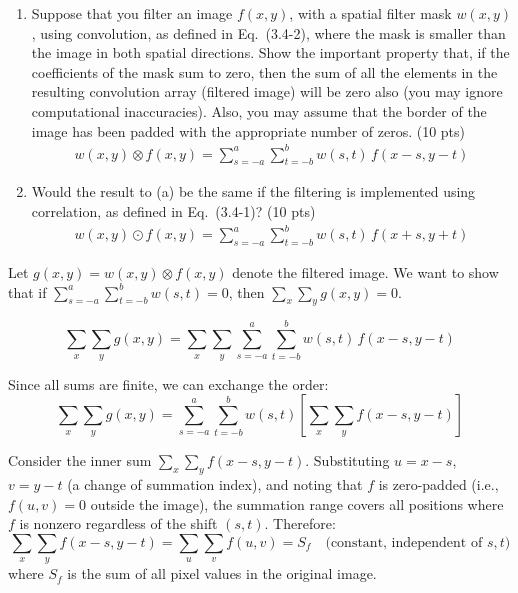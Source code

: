 \documentclass[12pt]{article}
\begin{document}
\begin{enumerate}[label=(\alph*)]
\item Suppose that you filter an image $f(x,y)$, with a spatial filter mask $w(x,y)$, using convolution, as defined in Eq.~(3.4-2), where the mask is smaller than the image in both spatial directions. Show the important property that, if the coefficients of the mask sum to zero, then the sum of all the elements in the resulting convolution array (filtered image) will be zero also (you may ignore computational inaccuracies). Also, you may assume that the border of the image has been padded with the appropriate number of zeros. (10 pts)
\begin{align}
w(x,y) \otimes f(x,y) = \sum_{s=-a}^{a} \sum_{t=-b}^{b} w(s,t)\, f(x-s, y-t) \tag{3.4-2}
\end{align}

\item Would the result to (a) be the same if the filtering is implemented using correlation, as defined in Eq.~(3.4-1)? (10 pts)
\begin{align}
w(x,y) \odot f(x,y) = \sum_{s=-a}^{a} \sum_{t=-b}^{b} w(s,t)\, f(x+s, y+t) \tag{3.4-1}
\end{align}
\end{enumerate}

\vspace{0.5cm}

\begin{stepbox}
Let $g(x,y) = w(x,y) \otimes f(x,y)$ denote the filtered image. We want to show that if $\displaystyle\sum_{s=-a}^{a}\sum_{t=-b}^{b} w(s,t) = 0$, then $\displaystyle\sum_x \sum_y g(x,y) = 0$.
\end{stepbox}

\begin{stepbox}
\[
\sum_x \sum_y g(x,y) = \sum_x \sum_y \sum_{s=-a}^{a} \sum_{t=-b}^{b} w(s,t)\, f(x-s, y-t)
\]
\end{stepbox}

\begin{stepbox}
Since all sums are finite, we can exchange the order:
\[
\sum_x \sum_y g(x,y) = \sum_{s=-a}^{a} \sum_{t=-b}^{b} w(s,t) \left[\sum_x \sum_y f(x-s, y-t)\right]
\]
\end{stepbox}

\begin{stepbox}
Consider the inner sum $\displaystyle\sum_x \sum_y f(x-s, y-t)$. Substituting $u = x - s$, $v = y - t$ (a change of summation index), and noting that $f$ is zero-padded (i.e., $f(u,v) = 0$ outside the image), the summation range covers all positions where $f$ is nonzero regardless of the shift $(s,t)$. Therefore:
\[
\sum_x \sum_y f(x-s, y-t) = \sum_u \sum_v f(u,v) = S_f \quad \text{(constant, independent of $s,t$)}
\]
where $S_f$ is the sum of all pixel values in the original image.
\end{stepbox}
\end{document}
